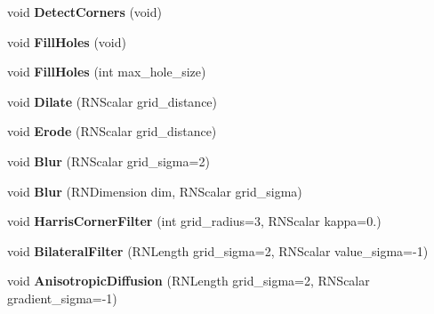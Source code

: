 \begin{DoxyCompactItemize}
\item 
void {\bfseries Detect\+Corners} (void)\hypertarget{class_r2_grid_a5de2ac96fa22596e9199099418212d08}{}\label{class_r2_grid_a5de2ac96fa22596e9199099418212d08}

\item 
void {\bfseries Fill\+Holes} (void)\hypertarget{class_r2_grid_ae3dd6e55fed559fcb84ce636b95a1a48}{}\label{class_r2_grid_ae3dd6e55fed559fcb84ce636b95a1a48}

\item 
void {\bfseries Fill\+Holes} (int max\+\_\+hole\+\_\+size)\hypertarget{class_r2_grid_a84453eecbcf8e8be8e7539da4fb0d797}{}\label{class_r2_grid_a84453eecbcf8e8be8e7539da4fb0d797}

\item 
void {\bfseries Dilate} (R\+N\+Scalar grid\+\_\+distance)\hypertarget{class_r2_grid_a5a6064c32ba76f6850f54a3a6aea4f36}{}\label{class_r2_grid_a5a6064c32ba76f6850f54a3a6aea4f36}

\item 
void {\bfseries Erode} (R\+N\+Scalar grid\+\_\+distance)\hypertarget{class_r2_grid_a0909da02a698c392f12a4407524566fb}{}\label{class_r2_grid_a0909da02a698c392f12a4407524566fb}

\item 
void {\bfseries Blur} (R\+N\+Scalar grid\+\_\+sigma=2)\hypertarget{class_r2_grid_a9ad95b5f2e2cf90faa944869e3345b26}{}\label{class_r2_grid_a9ad95b5f2e2cf90faa944869e3345b26}

\item 
void {\bfseries Blur} (R\+N\+Dimension dim, R\+N\+Scalar grid\+\_\+sigma)\hypertarget{class_r2_grid_af32163f0fcf74a7dca9fc6df3770d99a}{}\label{class_r2_grid_af32163f0fcf74a7dca9fc6df3770d99a}

\item 
void {\bfseries Harris\+Corner\+Filter} (int grid\+\_\+radius=3, R\+N\+Scalar kappa=0.)\hypertarget{class_r2_grid_adf04ce6ecff9875c546f2a46a7bc7319}{}\label{class_r2_grid_adf04ce6ecff9875c546f2a46a7bc7319}

\item 
void {\bfseries Bilateral\+Filter} (R\+N\+Length grid\+\_\+sigma=2, R\+N\+Scalar value\+\_\+sigma=-\/1)\hypertarget{class_r2_grid_a83e989d8e62a7d7ee43dbeafbfbdbdd6}{}\label{class_r2_grid_a83e989d8e62a7d7ee43dbeafbfbdbdd6}

\item 
void {\bfseries Anisotropic\+Diffusion} (R\+N\+Length grid\+\_\+sigma=2, R\+N\+Scalar gradient\+\_\+sigma=-\/1)\hypertarget{class_r2_grid_a4194e9d7286046de85d260f305fc6653}{}\label{class_r2_grid_a4194e9d7286046de85d260f305fc6653}


\end{DoxyCompactItemize}
